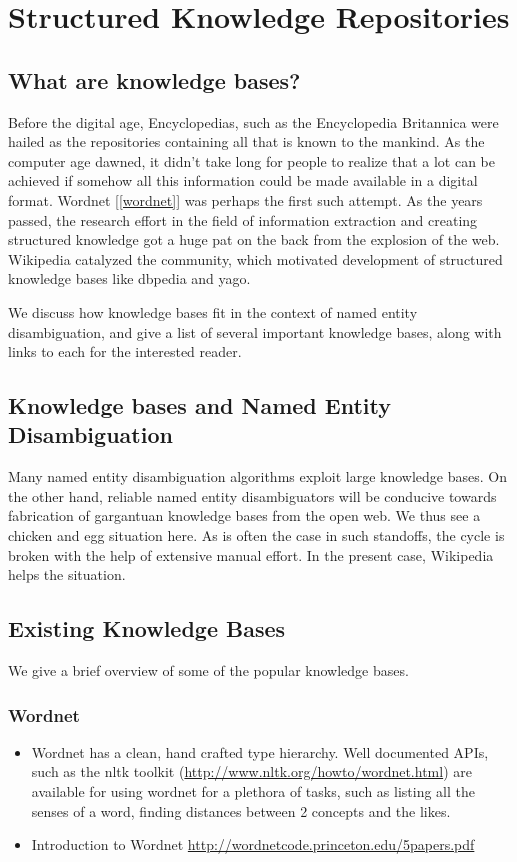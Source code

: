 \section{Structured Knowledge Repositories}
 \label{seckb}
\subsection{What are knowledge bases?}
Before the digital age, Encyclopedias, such as the Encyclopedia Britannica were hailed as the repositories containing
all that is known to the mankind. As the computer age dawned, it didn't take long for people to realize that a lot
can be achieved if somehow all this information could be made available in a digital format.
Wordnet [\ref{wordnet}] was perhaps the first such attempt. As the years passed, the research effort in the field of information extraction and creating 
structured knowledge got a huge pat on the back from the explosion of the web. Wikipedia catalyzed the community, which motivated development 
of structured knowledge bases like dbpedia and yago.

We discuss how knowledge bases fit in the context of named entity disambiguation, and give a list of several
important knowledge bases, along with links to each for the interested reader.

\subsection{Knowledge bases and Named Entity Disambiguation}

Many named entity disambiguation algorithms exploit large knowledge bases.
On the other hand, reliable named entity disambiguators will be conducive towards
fabrication of gargantuan knowledge bases from the open web. We thus see 
a chicken and egg situation here. As is often the case in such standoffs, the cycle is
broken with the help of extensive manual effort. In the present case, Wikipedia helps the
situation.


\subsection{Existing Knowledge Bases}
We give a brief overview of some of the popular knowledge bases.
\subsubsection{Wordnet}
\begin{itemize}
 \item Wordnet has a clean, hand crafted type hierarchy. Well documented APIs, such as the nltk toolkit
(\url{http://www.nltk.org/howto/wordnet.html}) are available for using wordnet for a 
plethora of tasks, such as listing all the senses of a word, finding distances between 
2 concepts and the likes.
 \item Introduction to Wordnet \url{http://wordnetcode.princeton.edu/5papers.pdf}
\end{itemize}


